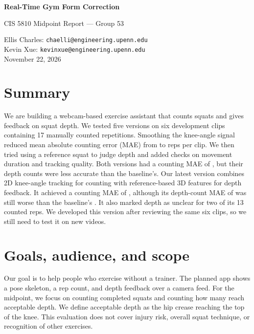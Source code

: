 \documentclass[10pt,letterpaper]{article}
\begin{document}
\begin{center}
{\LARGE\bfseries\color{ink} Real-Time Gym Form Correction}\par
\vspace{5pt}
{\large CIS 5810 Midpoint Report --- Group 53}\par
\vspace{5pt}
Ellis Charles: \texttt{chaelli@engineering.upenn.edu}\\
Kevin Xue: \texttt{kevinxue@engineering.upenn.edu}\\
\vspace{3pt}
November 22, 2026
\end{center}

\section*{Summary}
We are building a webcam-based exercise assistant that counts squats and gives
feedback on squat depth. We tested five versions on six development clips
containing 17 manually counted repetitions. Smoothing the knee-angle signal
reduced mean absolute counting error (MAE) from \BaseMAE{} to \SmoothMAE{} reps
per clip. We then tried using a reference squat to judge depth and added checks
on movement duration and tracking quality. Both versions had a counting MAE of
\RefMAE{}, but their depth counts were less accurate than the baseline's.
Our latest version combines 2D knee-angle tracking for counting with
reference-based 3D features for depth feedback. It achieved a counting MAE of
\HybridMAE{}, although its depth-count MAE of \HybridDepthMAE{} was still worse
than the baseline's \BaseDepthMAE{}. It also marked depth as unclear for two of
its 13 counted reps. We developed this version after reviewing the same six
clips, so we still need to test it on new videos.

\section{Goals, audience, and scope}
Our goal is to help people who exercise without a trainer. The planned app
shows a pose skeleton, a rep count, and depth feedback over a camera feed.
For the midpoint, we focus on counting completed squats and counting how many
reach acceptable depth. We define acceptable depth as the hip crease reaching
the top of the knee. This evaluation does not cover injury risk, overall squat
technique, or recognition of other exercises.
\end{document}
